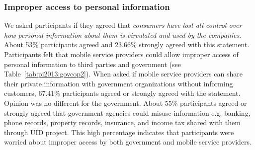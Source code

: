 \subsubsection{Improper access to personal information}
We asked participants if they agreed that \emph{consumers have lost all control over how personal information about them is circulated and used by the companies}. About 53\% participants agreed and 23.66\% strongly agreed with this statement. Participants felt that mobile service providers could allow improper access of personal information to third parties and government (see Table~\ref{tab:pi2013:govcop2}). When asked if mobile service providers can share their private information with government organizations without informing customers, 67.41\% participants agreed or strongly agreed with the statement. Opinion was no different for the government. About 55\% participants agreed or strongly agreed that government agencies could misuse information e.g. banking, phone records, property records, insurance, and income tax shared with them through UID project. This high percentage indicates that participants were worried about improper access by both government and mobile service providers.

